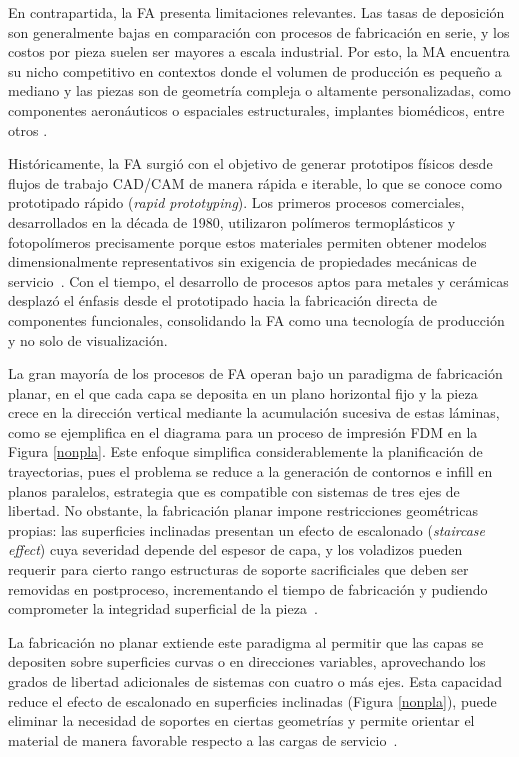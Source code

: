 En contrapartida, la FA presenta limitaciones relevantes. Las tasas de 
deposición son generalmente bajas en comparación con procesos de fabricación 
en serie, y los costos por pieza suelen ser mayores a escala industrial. 
Por esto, la MA encuentra su nicho competitivo en contextos donde el volumen 
de producción es pequeño a mediano y las piezas son de geometría compleja o 
altamente personalizadas, como componentes aeronáuticos o espaciales 
estructurales, implantes biomédicos, entre otros \cite{Herzog2016}.

Históricamente, la FA surgió con el objetivo de generar prototipos físicos 
desde flujos de trabajo CAD/CAM de manera rápida e iterable, lo que se conoce 
como prototipado rápido (\textit{rapid prototyping}). Los primeros procesos 
comerciales, desarrollados en la década de 1980, utilizaron polímeros 
termoplásticos y fotopolímeros precisamente porque estos materiales permiten 
obtener modelos dimensionalmente representativos sin exigencia de propiedades 
mecánicas de servicio~\cite{Gibson2015}. Con el tiempo, el desarrollo de 
procesos aptos para metales y cerámicas desplazó el énfasis desde el 
prototipado hacia la fabricación directa de componentes funcionales, 
consolidando la FA como una tecnología de producción y no solo de 
visualización.

La gran mayoría de los procesos de FA operan bajo un paradigma de 
fabricación planar, en el que cada capa se deposita en un plano horizontal 
fijo y la pieza crece en la dirección vertical mediante la acumulación 
sucesiva de estas láminas, como se ejemplifica en el diagrama para un proceso de impresión FDM en la Figura \ref{nonpla}. Este enfoque simplifica considerablemente la 
planificación de trayectorias, pues el problema 
se reduce a la generación de contornos e infill en planos paralelos, 
estrategia que es compatible con sistemas de tres ejes de libertad. No 
obstante, la fabricación planar impone restricciones geométricas propias: 
las superficies inclinadas presentan un efecto de escalonado (\textit{staircase 
	effect}) cuya severidad depende del espesor de capa, y los voladizos 
pueden requerir para cierto rango estructuras de soporte sacrificiales que deben ser removidas en 
postproceso, incrementando el tiempo de fabricación y pudiendo comprometer 
la integridad superficial de la pieza~\cite{Gibson2015}.

La fabricación no planar extiende este paradigma al permitir que las capas se depositen sobre 
superficies curvas o en direcciones variables, aprovechando los grados de 
libertad adicionales de sistemas con cuatro o más ejes. Esta capacidad 
reduce el efecto de escalonado en superficies inclinadas (Figura \ref{nonpla}), puede eliminar 
la necesidad de soportes en ciertas geometrías y permite orientar el 
material de manera favorable respecto a las cargas de servicio~\cite{AFSHARI2025284}. 

